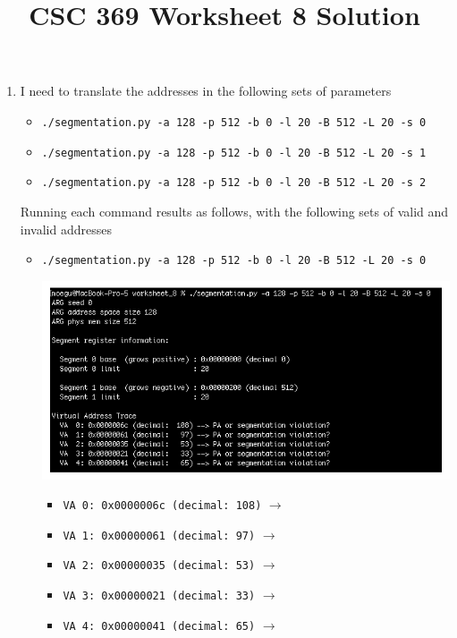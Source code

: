 \documentclass[12pt]{article}
\begin{document}
\title{CSC 369 Worksheet 8 Solution}

\maketitle

\bigskip

\begin{enumerate}[1.]
    \item

    \bigskip

    I need to translate the addresses in the following sets of parameters

    \begin{itemize}
        \item \texttt{./segmentation.py -a 128 -p 512 -b 0 -l 20 -B 512 -L 20 -s 0}
        \item \texttt{./segmentation.py -a 128 -p 512 -b 0 -l 20 -B 512 -L 20 -s 1}
        \item \texttt{./segmentation.py -a 128 -p 512 -b 0 -l 20 -B 512 -L 20 -s 2}
    \end{itemize}

    \bigskip

    Running each command results as follows, with the following sets of valid and invalid
    addresses

    \bigskip

    \begin{itemize}
        \item \texttt{./segmentation.py -a 128 -p 512 -b 0 -l 20 -B 512 -L 20 -s 0}

        \begin{center}
        \includegraphics[width=0.8\linewidth]{images/worksheet_8_solution_3.png}
        \end{center}

        \begin{itemize}
            \item \texttt{VA  0: 0x0000006c (decimal:  108)} $\to$
            \item \texttt{VA  1: 0x00000061 (decimal:   97)} $\to$
            \item \texttt{VA  2: 0x00000035 (decimal:   53)} $\to$
            \item \texttt{VA  3: 0x00000021 (decimal:   33)} $\to$
            \item \texttt{VA  4: 0x00000041 (decimal:   65)} $\to$
        \end{itemize}


\end{itemize}
\end{enumerate}
\end{document}
